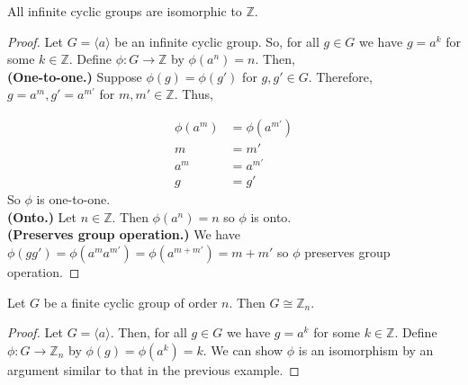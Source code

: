 \documentclass[12pt]{article}
\newcommand{\Z}{\mathbb{Z}}
\begin{document}
	\begin{myex}{}{}
		All infinite cyclic groups are isomorphic to $\Z$.
		\begin{proof}
			Let $G=\langle a\rangle$ be an infinite cyclic group. So, for all $g\in G$ we have $g=a^k$ for some $k\in\Z$. Define $\phi:G\to\Z$ by $\phi(a^n)=n$. Then,\\
			
			\textbf{(One-to-one.)} Suppose $\phi(g)=\phi(g')$ for $g, g'\in G$. Therefore, $g=a^m, g'=a^{m'}$ for $m, m'\in\Z$. Thus,
				
			\begin{align*}
				\phi(a^m)&=\phi(a^{m'})\\
				m&=m'\\
				a^m&=a^{m'}\\
				g&=g'
			\end{align*}
			So $\phi$ is one-to-one.\\
			
			\textbf{(Onto.)} Let $n\in\Z$. Then $\phi(a^n)=n$ so $\phi$ is onto.\\
			
			\textbf{(Preserves group operation.)} We have $\phi(gg')=\phi(a^ma^{m'})=\phi(a^{m+m'})=m+m'$ so $\phi$ preserves group operation.
		\end{proof}
	\end{myex}
	
	\begin{myex}{}{}
		Let $G$ be a finite cyclic group of order $n$. Then $G\cong\Z_n$.
		\begin{proof}
			Let $G=\langle a\rangle$. Then, for all $g\in G$ we have $g=a^k$ for some $k\in\Z$. Define $\phi:G\to\Z_n$ by $\phi(g)=\phi(a^k)=k$. We can show $\phi$ is an isomorphism by an argument similar to that in the previous example.
		\end{proof}
	\end{myex}
	
\end{document}

